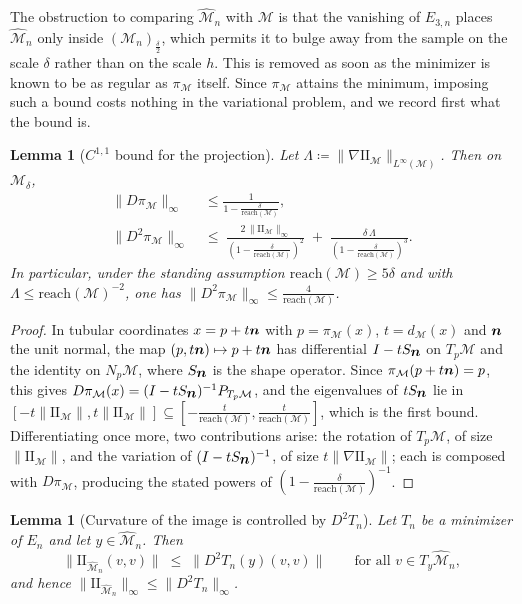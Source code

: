 \documentclass[11pt]{amsart}%
\theoremstyle{plain}
\newtheorem{lemma}[definition]{Lemma}
\def\nn{\mbox{\boldmath $n$}}
\newcommand{\1}{\mathbf{1}}
\newcommand{\M}{\mathcal{M}}
\newcommand{\II}{\mathrm{I\!I}}   %
\begin{document}
The obstruction to comparing $\widehat{\M}_n$ with $\M$ is that the vanishing of $E_{3,n}$
places $\widehat{\M}_n$ only inside $(\M_n)_{\frac{\delta}{2}}$, which permits it to bulge away from the
sample on the scale $\delta$ rather than on the scale $h$. This is removed as soon as the minimizer
is known to be as regular as $\pi_\M$ itself. Since $\pi_\M$ attains the minimum, imposing such a
bound costs nothing in the variational problem, and we record first what the bound is.

\begin{lemma}[$C^{1,1}$ bound for the projection]
    \label{Lem:C11proj}
    Let $\Lambda\coloneqq\|\nabla \II_\M\|_{L^\infty(\M)}$. Then on $\M_\delta$,
    \begin{align*}
        \|D\pi_\M\|_\infty&\le\frac{1}{1-\frac{\delta}{\mathrm{reach}(\M)}},\\
        \|D^2\pi_\M\|_\infty\;&\le\;
        \frac{2\,\|\II_\M\|_\infty}{\left(1-\frac{\delta}{\mathrm{reach}(\M)}\right)^{2}}
        \;+\;\frac{\delta\,\Lambda}{\left(1-\frac{\delta}{\mathrm{reach}(\M)}\right)^{3}} .
    \end{align*}
    In particular, under the standing assumption $\mathrm{reach}(\M)\ge 5\delta$ and with
    $\Lambda\le\mathrm{reach}(\M)^{-2}$, one has $\|D^2\pi_\M\|_\infty\le \frac{4}{\mathrm{reach}(\M)}$.
\end{lemma}

\begin{proof}
    In tubular coordinates $x=p+t\nn$ with $p=\pi_\M(x)$, $t=d_\M(x)$ and $\nn$ the unit
    normal, the map $(p,t\nn)\mapsto p+t\nn$ has differential $I-tS_{\nn}$ on
    $T_p\M$ and the identity on $N_p\M$, where $S_{\nn}$ is the shape operator. Since
    $\pi_\M(p+t\nn)=p$, this gives
    $D\pi_\M(x)=(I-tS_{\nn})^{-1}P_{T_p\M}$, and the eigenvalues of $tS_{\nn}$ lie in
    $[-t\|\II_\M\|,t\|\II_\M\|]\subseteq\left[-\frac{t}{\mathrm{reach}(\M)},\frac{t}{\mathrm{reach}(\M)}\right]$,
    which is the first bound. Differentiating once more, two contributions arise: the rotation of
    $T_p\M$, of size $\|\II_\M\|$, and the variation of $(I-tS_{\nn})^{-1}$, of size
    $t\|\nabla \II_\M\|$; each is composed with $D\pi_\M$, producing the stated powers of
    $\left(1-\frac{\delta}{\mathrm{reach}(\M)}\right)^{-1}$. 
\end{proof}

\begin{lemma}[Curvature of the image is controlled by $D^2T_n$]
    \label{Lem:IIimage}
    Let $T_n$ be a minimizer of $E_n$ and let $y\in\widehat{\M}_n$. Then
    \[
        \bigl\|\II_{\widehat{\M}_n}(v,v)\bigr\|\;\le\;\bigl\|D^2T_n(y)(v,v)\bigr\|
        \qquad\text{for all } v\in T_y\widehat{\M}_n ,
    \]
    and hence $\|\II_{\widehat{\M}_n}\|_\infty\le\|D^2T_n\|_\infty$.
\end{lemma}
\end{document}
